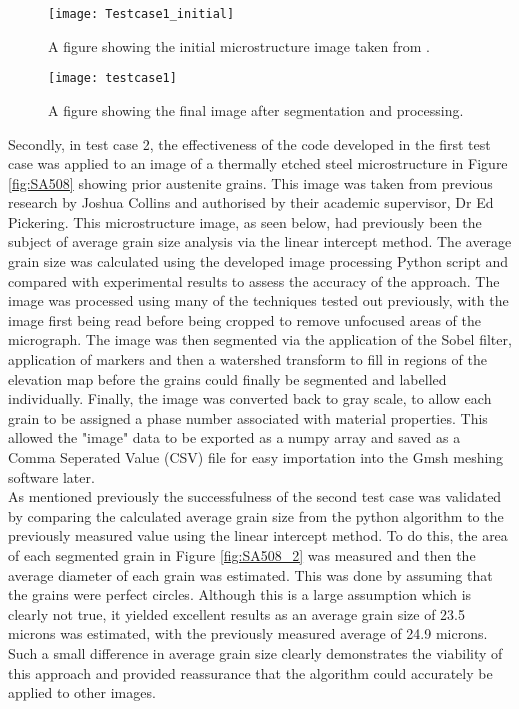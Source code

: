 \documentclass[\report.tex]{subfiles}
\begin{document}
\begin{figure}[!htb]
  \centering
  \begin{minipage}[!htb]{.5\textwidth}
    \centering\captionsetup{width=.8\linewidth}%
    \texttt{[image: Testcase1\_initial]}
    \caption{A figure showing the initial microstructure image taken from \cite{CallisterJrWilliamD2000MSaE}.}\label{fig:Testcase1}
  \end{minipage}%
  \begin{minipage}[!htb]{.5\textwidth}
    \centering\captionsetup{width=.8\linewidth}%
    \texttt{[image: testcase1]}
    \caption{A figure showing the final image after segmentation and processing.}
    \label{fig:Testcase1_2}
  \end{minipage}
\end{figure}

\pagebreak
\noindent Secondly, in test case 2, the effectiveness of the code developed in the first test case was applied to an image of a thermally etched steel microstructure in Figure \ref{fig:SA508} showing prior austenite grains. This image was taken from previous research by Joshua Collins and authorised by their academic supervisor, Dr Ed Pickering. This microstructure image, as seen below, had previously been the subject of average grain size analysis via the linear intercept method. The average grain size was calculated using the developed image processing Python script and compared with experimental results to assess the accuracy of the approach. The image was processed using many of the techniques tested out previously, with the image first being read before being cropped to remove unfocused areas of the micrograph. The image was then segmented via the application of the Sobel filter, application of markers and then a watershed transform to fill in regions of the elevation map before the grains could finally be segmented and labelled individually. Finally, the image was converted back to gray scale, to allow each grain to be assigned a phase number associated with material properties. This allowed the "image" data to be exported as a numpy array and saved as a Comma Seperated Value (CSV) file for easy importation into the Gmsh meshing software later.\\

\noindent As mentioned previously the successfulness of the second test case was validated by comparing the calculated average grain size from the python algorithm to the previously measured value using the linear intercept method. To do this, the area of each segmented grain in Figure \ref{fig:SA508_2} was measured and then the average diameter of each grain was estimated. This was done by assuming that the grains were perfect circles. Although this is a large assumption which is clearly not true, it yielded excellent results as an average grain size of 23.5 microns was estimated, with the previously measured average of 24.9 microns. Such a small difference in average grain size clearly demonstrates the viability of this approach and provided reassurance that the algorithm could accurately be applied to other images. \\
\end{document}
